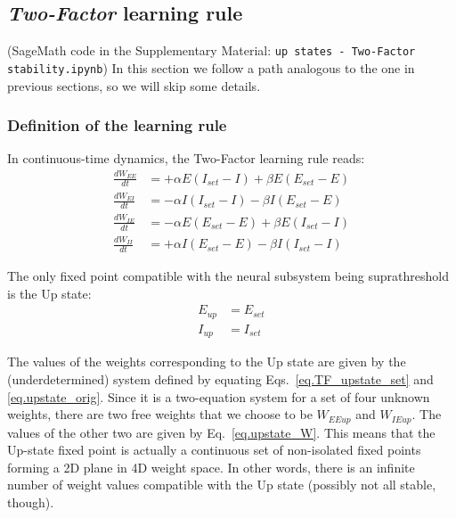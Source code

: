 \documentclass[
twocolumn,
]{article}
\newcommand{\EE}{\mathit{EE}}
\newcommand{\EI}{\mathit{EI}}
\newcommand{\IE}{\mathit{IE}}
\newcommand{\II}{\mathit{II}}
\newcommand{\set}{\mathit{set}}
\newcommand{\up}{\mathit{up}}
\begin{document}




\subsection{{\em Two-Factor} learning rule}
\label{sec.TF_details}

(SageMath code in the Supplementary Material: {\tt up states - Two-Factor stability.ipynb})
In this section we follow a path analogous to the one in previous sections, so we will skip some details.


\subsubsection{Definition of the learning rule}

In continuous-time dynamics, the Two-Factor learning rule reads:
\begin{equation}
\begin{aligned}
\frac{dW_{\EE}}{dt} & = +\alpha E (I_{\set} - I) + \beta E (E_{\set} - E) \\
\frac{dW_{\EI}}{dt} & = -\alpha I (I_{\set} - I) - \beta I (E_{\set} - E) \\
\frac{dW_{\IE}}{dt} & = -\alpha E (E_{\set} - E) + \beta E (I_{\set} - I) \\
\frac{dW_{\II}}{dt} & = +\alpha I (E_{\set} - E) - \beta I (I_{\set} - I)
\end{aligned}
\label{eq.TF_equation}
\end{equation}

The only fixed point compatible with the neural subsystem being suprathreshold is the Up state:
\begin{equation}
\begin{aligned}
E_{\up} & = E_{\set} \\
I_{\up} & = I_{\set}
\end{aligned}
\label{eq.TF_upstate_set}
\end{equation}

\noindent The values of the weights corresponding to the Up state are given by the (underdetermined) system defined by equating Eqs.\ \ref{eq.TF_upstate_set} and \ref{eq.upstate_orig}. Since it is a two-equation system for a set of four unknown weights, there are two free weights that we choose to be $W_{\EE\up}$ and $W_{\IE\up}$. The values of the other two are given by Eq.\ \ref{eq.upstate_W}. This means that the Up-state fixed point is actually a continuous set of non-isolated fixed points forming a 2D plane in 4D weight space. In other words, there is an infinite number of weight values compatible with the Up state (possibly not all stable, though).
\end{document}
